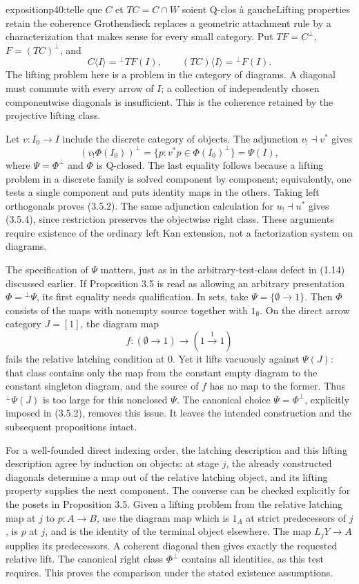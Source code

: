 \begin{dcomment}{exposition}{p40:telle que $C$ et $TC=C\cap W$ soient Q-clos à gauche}{Lifting properties retain the coherence}
Grothendieck replaces a geometric attachment rule by a characterization that makes sense for every small category. Put $TF=C^\perp$, $F=(TC)^\perp$, and
\[
 C\langle I\rangle={}^\perp TF(I),\qquad
 (TC)\langle I\rangle={}^\perp F(I).
\]
The lifting problem here is a problem in the category of diagrams. A diagonal must commute with every arrow of $I$; a collection of independently chosen componentwise diagonals is insufficient. This is the coherence retained by the projective lifting class.

Let $v:I_0\to I$ include the discrete category of objects. The adjunction $v_!\dashv v^*$ gives
\[
 (v_!\Phi(I_0))^\perp
   =\{p:v^*p\in\Phi(I_0)^\perp\}
   =\Psi(I),
\]
where $\Psi=\Phi^\perp$ and $\Phi$ is Q-closed. The last equality follows because a lifting problem in a discrete family is solved component by component; equivalently, one tests a single component and puts identity maps in the others. Taking left orthogonals proves (3.5.2). The same adjunction calculation for $u_!\dashv u^*$ gives (3.5.4), since restriction preserves the objectwise right class. These arguments require existence of the ordinary left Kan extension, not a factorization system on diagrams.

The specification of $\Psi$ matters, just as in the arbitrary-test-class defect in (1.14) discussed earlier. If Proposition 3.5 is read as allowing an arbitrary presentation $\Phi={}^\perp\Psi$, its first equality needs qualification. In sets, take $\Psi=\{\emptyset\to1\}$. Then $\Phi$ consists of the maps with nonempty source together with $1_{\emptyset}$. On the direct arrow category $J=[1]$, the diagram map
\[
 f:(\emptyset\longrightarrow1)\longrightarrow(1\xrightarrow{1}1)
\]
fails the relative latching condition at $0$. Yet it lifts vacuously against $\Psi(J)$: that class contains only the map from the constant empty diagram to the constant singleton diagram, and the source of $f$ has no map to the former. Thus ${}^\perp\Psi(J)$ is too large for this nonclosed $\Psi$. The canonical choice $\Psi=\Phi^\perp$, explicitly imposed in (3.5.2), removes this issue. It leaves the intended construction and the subsequent propositions intact.

For a well-founded direct indexing order, the latching description and this lifting description agree by induction on objects: at stage $j$, the already constructed diagonals determine a map out of the relative latching object, and its lifting property supplies the next component. The converse can be checked explicitly for the posets in Proposition 3.5. Given a lifting problem from the relative latching map at $j$ to $p:A\to B$, use the diagram map which is $1_A$ at strict predecessors of $j$, is $p$ at $j$, and is the identity of the terminal object elsewhere. The map $L_jY\to A$ supplies its predecessors. A coherent diagonal then gives exactly the requested relative lift. The canonical right class $\Phi^\perp$ contains all identities, as this test requires. This proves the comparison under the stated existence assumptions.


\end{dcomment}
